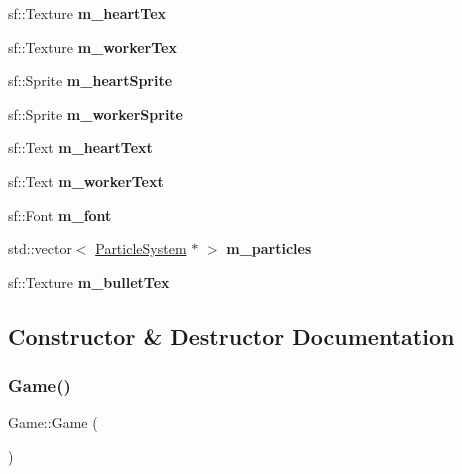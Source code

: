 \begin{DoxyCompactItemize}
\mbox{\label{class_game_a8c9545659212304d00a4e637f331dba8}} 
sf\+::\+Texture {\bfseries m\+\_\+heart\+Tex}
\item 
\mbox{\label{class_game_a008a66ca39b6dccb8631c17663e013d8}} 
sf\+::\+Texture {\bfseries m\+\_\+worker\+Tex}
\item 
\mbox{\label{class_game_aa02a4a51979c3176fe39df9593a7bf6c}} 
sf\+::\+Sprite {\bfseries m\+\_\+heart\+Sprite}
\item 
\mbox{\label{class_game_a56f697c84aafadb61ed676f323a30479}} 
sf\+::\+Sprite {\bfseries m\+\_\+worker\+Sprite}
\item 
\mbox{\label{class_game_af2db6e375436b38baab7db80ac663112}} 
sf\+::\+Text {\bfseries m\+\_\+heart\+Text}
\item 
\mbox{\label{class_game_a815af4b3dee6999ed7625e7e0f0ae0c8}} 
sf\+::\+Text {\bfseries m\+\_\+worker\+Text}
\item 
\mbox{\label{class_game_af5c5c39d0eabe68c3bfff3509900a489}} 
sf\+::\+Font {\bfseries m\+\_\+font}
\item 
\mbox{\label{class_game_ac7736cd8da43009ca95d65724c020319}} 
std\+::vector$<$ \mbox{\hyperlink{class_particle_system}{Particle\+System}} $\ast$ $>$ {\bfseries m\+\_\+particles}
\item 
\mbox{\label{class_game_ab35d3ba20101c82cdc8adb822870c4f0}} 
sf\+::\+Texture {\bfseries m\+\_\+bullet\+Tex}
\end{DoxyCompactItemize}


\subsection{Constructor \& Destructor Documentation}
\mbox{\label{class_game_ad59df6562a58a614fda24622d3715b65}} 
\subsubsection{\texorpdfstring{Game()}{Game()}}
{\footnotesize\ttfamily Game\+::\+Game (\begin{DoxyParamCaption}{ }\end{DoxyParamCaption})}



